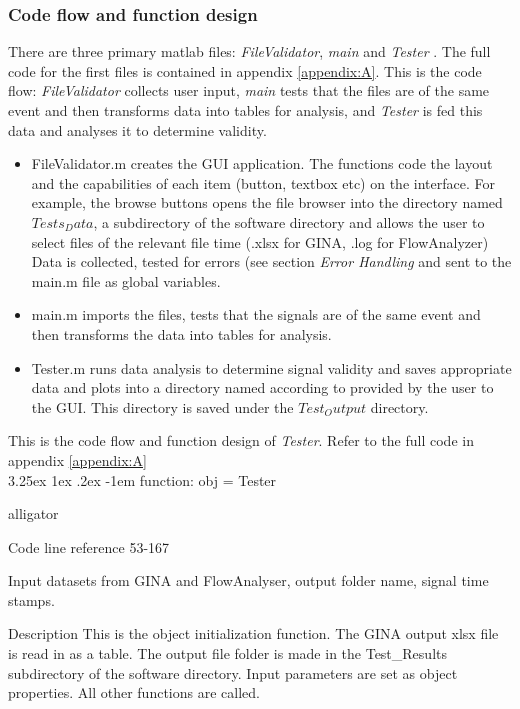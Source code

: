 \documentclass[12pt, openany, oneside]{book}
\makeatletter
\renewcommand\subparagraph{\@startsection{subparagraph}{6}{\parindent}%
  {3.25ex \@plus1ex \@minus .2ex}%
  {-1em}%
  {\normalfont\normalsize\bfseries}}
\makeatother
\begin{document}
\subsubsection{Code flow and function design}
There are three primary matlab files: \textit{FileValidator}, \textit{main} and \textit{Tester} . The full code for the first files is contained in appendix \ref{appendix:A}.
This is the code flow: \textit{FileValidator} collects user input, \textit{main} tests that the files are of the same event and then transforms data into tables for analysis, and \textit{Tester} is fed this data and analyses it to determine validity. 
\begin{itemize}
	\item FileValidator.m creates the GUI application. The functions code the layout and the capabilities of each item (button, textbox etc) on the interface. For example, the browse buttons opens the file browser into the directory named $Tests_Data$, a subdirectory of the software directory and allows the user to select files of the relevant file time (.xlsx for GINA, .log for FlowAnalyzer)
Data is collected, tested for errors (see section \textit{Error Handling} and sent to the main.m file as global variables. 
	\item main.m imports the files, tests that the signals are of the same event and then transforms the data into tables for analysis.
	\item	Tester.m runs data analysis to determine signal validity and saves appropriate data and plots into a directory named according to provided by the user to the GUI. This directory is saved under the $Test_Output$ directory. 
\end{itemize}

This is the code flow and function design of \textit{Tester}. Refer to the full code in appendix \ref{appendix:A} \\

\subparagraph{function: obj = Tester}
\begin{labeling}{alligator}
\item[Code line reference] 53-167
\item[Input] datasets from GINA and FlowAnalyser, output folder name, signal time stamps.
\item[Description] This is the object initialization function. The GINA output xlsx file is read in as a table. The output file folder is made in the Test\_Results subdirectory of the software directory. Input parameters are set as object properties. All other functions are called.
\end{labeling}
\end{document}
